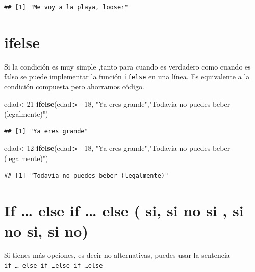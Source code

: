 \documentclass[
]{book}
\newenvironment{Shaded}{\begin{snugshade}}{\end{snugshade}}
\newcommand{\DecValTok}[1]{\textcolor[rgb]{0.00,0.00,0.81}{#1}}
\newcommand{\FunctionTok}[1]{\textcolor[rgb]{0.13,0.29,0.53}{\textbf{#1}}}
\newcommand{\NormalTok}[1]{#1}
\newcommand{\OtherTok}[1]{\textcolor[rgb]{0.56,0.35,0.01}{#1}}
\newcommand{\SpecialCharTok}[1]{\textcolor[rgb]{0.81,0.36,0.00}{\textbf{#1}}}
\newcommand{\StringTok}[1]{\textcolor[rgb]{0.31,0.60,0.02}{#1}}
\begin{document}
\begin{verbatim}
## [1] "Me voy a la playa, looser"
\end{verbatim}

\hypertarget{ifelse}{%
\section{ifelse}\label{ifelse}}

Si la condición es muy simple ,tanto para cuando es verdadero como cuando es falso se puede implementar la función \texttt{ifelse} en una línea. Es equivalente a la condición compuesta pero ahorramos código.

\begin{Shaded}
\begin{Highlighting}[]
\NormalTok{edad}\OtherTok{\textless{}{-}}\DecValTok{21}
\FunctionTok{ifelse}\NormalTok{(edad}\SpecialCharTok{\textgreater{}=}\DecValTok{18}\NormalTok{, }\StringTok{"Ya eres grande"}\NormalTok{,}\StringTok{"Todavia no puedes beber (legalmente)"}\NormalTok{)}
\end{Highlighting}
\end{Shaded}

\begin{verbatim}
## [1] "Ya eres grande"
\end{verbatim}

\begin{Shaded}
\begin{Highlighting}[]
\NormalTok{edad}\OtherTok{\textless{}{-}}\DecValTok{12}
\FunctionTok{ifelse}\NormalTok{(edad}\SpecialCharTok{\textgreater{}=}\DecValTok{18}\NormalTok{, }\StringTok{"Ya eres grande"}\NormalTok{,}\StringTok{"Todavia no puedes beber (legalmente)"}\NormalTok{)}
\end{Highlighting}
\end{Shaded}

\begin{verbatim}
## [1] "Todavia no puedes beber (legalmente)"
\end{verbatim}

\hypertarget{if-else-if-else-si-si-no-si-si-no-si-si-no}{%
\section{If \ldots{} else if \ldots{} else ( si, si no si , si no si, si no)}\label{if-else-if-else-si-si-no-si-si-no-si-si-no}}

Si tienes más opciones, es decir no alternativas, puedes usar la sentencia \texttt{if\ …\ else\ if\ …else\ if\ …else}
\end{document}
